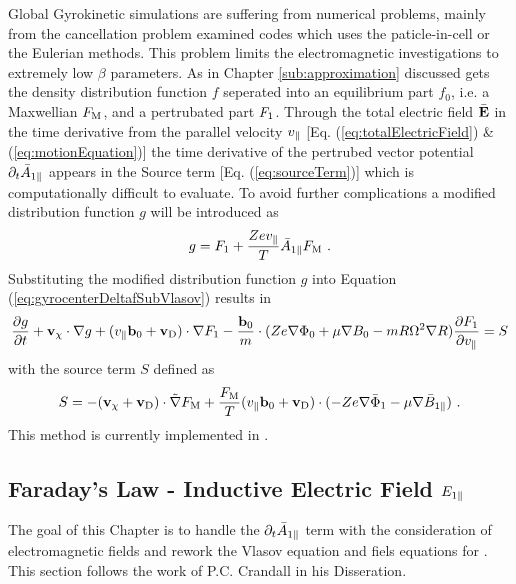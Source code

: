 Global Gyrokinetic simulations are suffering from numerical problems, mainly from the cancellation problem \cite{Chen2001} examined codes \cite{Cummings_PHD} which uses the paticle-in-cell or the Eulerian methods. This problem limits the electromagnetic investigations to extremely low $\beta$ parameters. \cite{Naitou1995} As in Chapter \ref{sub:approximation} discussed gets the density distribution function $f$ seperated into an equilibrium part $f_0$, i.e. a Maxwellian $F_\mathrm{M}$, and a pertrubated part $F_1$. Through the total electric field $\bar{\boldsymbol{\mathbf{E}}}$ in the time derivative from the parallel velocity $v_\parallel$ [Eq. (\ref{eq:totalElectricField}) \& (\ref{eq:motionEquation})] the time derivative of the pertrubed vector potential $\partial_t \bar{A}_{1\parallel}$ appears in the Source term [Eq. (\ref{eq:sourceTerm})] which is computationally difficult to evaluate. To avoid further complications a modified distribution function $g$ will be introduced as
\begin{gather}
	g = F_1 + \frac{Ze v_\parallel}{T} \bar{A}_{1\parallel} F_\mathrm{M} ~.
	\label{eq:modifiedDistrubutionFunction}
\end{gather}
Substituting the modified distribution function $g$ into Equation (\ref{eq:gyrocenterDeltafSubVlasov}) results in
\begin{gather}
	\frac{\partial g}{\partial t} + \boldsymbol{\mathbf{v}}_\chi \cdot \nabla g + (v_\parallel \boldsymbol{\mathbf{b}}_0 + \boldsymbol{\mathbf{v}}_\mathrm{D}) \cdot \nabla F_1 - \frac{\boldsymbol{\mathbf{b}}_0}{m} \cdot (Z e \nabla \Phi_0 + \mu \nabla B_0 - m R \Omega^2 \nabla R) \frac{\partial F_1}{\partial v_\parallel} = S
	\label{eq:modifiedGyrocenterDeltafSubVlasov}
\end{gather}
with the source term $S$ defined as
\begin{gather}
	S = - (\boldsymbol{\mathbf{v}}_\chi + \boldsymbol{\mathbf{v}}_\mathrm{D}) \cdot \tilde{\nabla} F_\mathrm{M} + \frac{F_\mathrm{M}}{T} (v_\parallel \boldsymbol{\mathbf{b}}_0 + \boldsymbol{\mathbf{v}}_\mathrm{D}) \cdot (-Ze \nabla \bar{\Phi}_1 - \mu \nabla \bar{B}_{1\parallel}) ~.
	\label{eq:modifiedSourceTerm}
\end{gather}
This method is currently implemented in \gkw\cite{Peeters2009A}.

\newpage


\subsection{Faraday's Law - Inductive Electric Field $E_{1\parallel}$}
\label{sub:fieldEpar}

The goal of this Chapter is to handle the $\partial_t \bar{A}_{1\parallel}$ term with the consideration of electromagnetic fields and rework the Vlasov equation and fiels equations for \gkw. This section follows the work of P.C. Crandall in his Disseration\cite{Crandall_PHD}.
\bigskip

